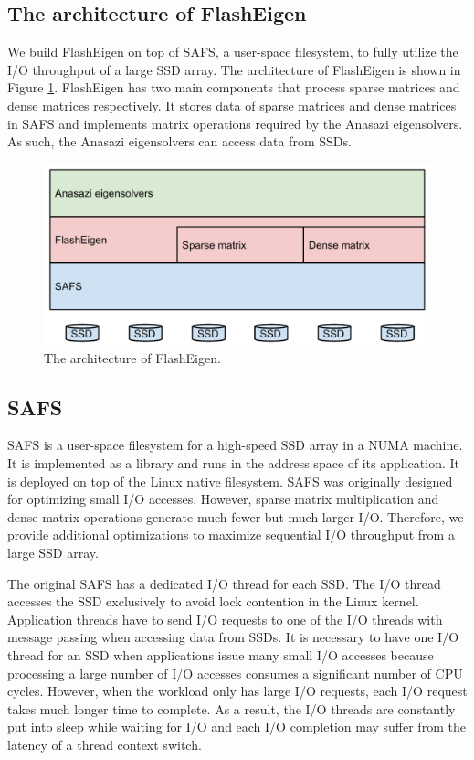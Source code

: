 \subsection{The architecture of FlashEigen}

We build FlashEigen on top of SAFS, a user-space filesystem, to fully utilize
the I/O throughput of a large SSD array. The architecture of FlashEigen is shown
in Figure \ref{arch}. FlashEigen has two main components that process sparse
matrices and dense matrices respectively. It stores data of sparse matrices
and dense matrices
in SAFS and implements matrix operations required by the Anasazi eigensolvers.
As such, the Anasazi eigensolvers can access data from SSDs.

\begin{figure}
\centering
\includegraphics[scale=0.4]{./architecture.pdf}
\vspace{-5pt}
\caption{The architecture of FlashEigen.}
\vspace{-5pt}
\label{arch}
\end{figure}

\subsection{SAFS}

SAFS \cite{safs} is a user-space filesystem for a high-speed SSD array in
a NUMA machine. It is implemented as a library and runs in the address space
of its application. It is deployed on top of the Linux native filesystem.
SAFS was originally designed for optimizing small I/O accesses. However,
sparse matrix multiplication and dense matrix operations
generate much fewer but much larger I/O. Therefore, we provide additional
optimizations to maximize sequential I/O throughput from a large SSD array.

The original SAFS has a dedicated I/O thread for each SSD. The I/O thread
accesses the SSD exclusively to avoid lock contention in the Linux kernel.
Application threads have to send I/O requests to one of the I/O threads
with message passing when accessing data from SSDs. It is necessary to have
one I/O thread for
an SSD when applications issue many small I/O accesses because processing
a large number of I/O accesses consumes a significant number of CPU cycles.
However, when the workload only has large I/O requests, each I/O request takes
much longer time to complete. As a result, the I/O threads are constantly put
into sleep while waiting for I/O and each I/O completion may suffer from
the latency of a thread context switch.

